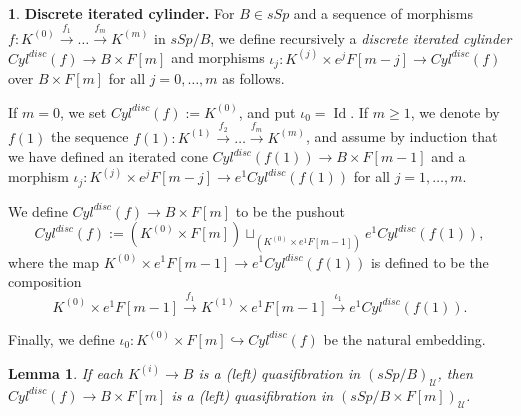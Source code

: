 \documentclass[12pt]{amsart}
\theoremstyle{plain}
\newtheorem{Lem}[Thm]{Lemma}
\theoremstyle{definition}
\newtheorem{Emp}[Thm]{}
\numberwithin{equation}{section}
\newcommand{\cal}[1]{\mathcal{#1}}
\newcommand{\C}[1]{\cal#1}
\newcommand{\lra}{\longrightarrow}
\newcommand{\hra}{\hookrightarrow}
\newcommand{\Id}{\operatorname{Id}}
\begin{document}
\begin{Emp} \label{E:itercyl}
{\bf Discrete iterated cylinder.} For $B\in sSp$ and a sequence of
morphisms $f: K^{(0)}\overset{f_1}{\to} \ldots
\overset{f_{m}}{\to}K^{(m)}$ in $sSp/B$, we define recursively a
{\em discrete iterated cylinder} $Cyl^{disc}(f)\to B\times F[m]$
and morphisms $\iota_j:K^{(j)}\times e^j F[m-j]\to Cyl^{disc}(f)$
over $B\times F[m]$ for all $j=0,\ldots, m$ as follows.

If $m=0$, we set $Cyl^{disc}(f):=K^{(0)}$, and put $\iota_0=\Id$.
If $m\geq 1$, we denote by $f(1)$ the sequence $f(1):
K^{(1)}\overset{f_2}{\to}\ldots \overset{f_{m}}{\to}K^{(m)}$, and
assume by induction that we have defined an iterated cone
$Cyl^{disc}(f(1))\to B\times F[m-1]$ and a morphism $\iota_j:
K^{(j)}\times e^{j}F[m-j]\to e^1 Cyl^{disc}(f(1))$ for all
$j=1,\ldots,m$.

We define $Cyl^{disc}(f)\to B\times F[m]$ to be the pushout
%
\begin{equation} \label{Eq:itercyl}
Cyl^{disc}(f):=(K^{(0)}\times F[m])\sqcup_{(K^{(0)}\times e^1
F[m-1])}e^1 Cyl^{disc}(f(1)),
\end{equation}
%
where the map  $K^{(0)}\times e^1 F[m-1]\to e^1 Cyl^{disc}(f(1))$
is defined to be the composition
%
\[
K^{(0)}\times e^1 F[m-1]\overset{f_1}{\lra} K^{(1)}\times e^1
F[m-1]\overset{\iota_1}{\lra}e^1 Cyl^{disc}(f(1)).
\]

Finally, we define $\iota_0:K^{(0)}\times F[m]\hra Cyl^{disc}(f)$
be the natural embedding.
\end{Emp}


\begin{Lem} \label{L:disc}
If each $K^{(i)}\to B$ is a (left) quasifibration in
$(sSp/B)_{\C{U}}$, then  $Cyl^{disc}(f)\to B\times F[m]$ is a
(left) quasifibration in $(sSp/B\times F[m])_{\C{U}}$.
\end{Lem}
\end{document}
